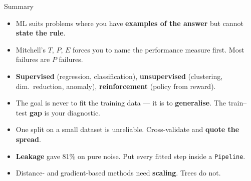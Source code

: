 \documentclass[aspectratio=169]{beamer}
\begin{document}
\begin{frame}[shrink=8]{Summary}
  \begin{itemize}[<+->]
    \item ML suits problems where you have \textbf{examples of the answer} but cannot \textbf{state the rule}.
    \item Mitchell's $T$, $P$, $E$ forces you to name the performance measure first. Most failures are $P$ failures.
    \item \textbf{Supervised} (regression, classification), \textbf{unsupervised} (clustering, dim.\ reduction, anomaly), \textbf{reinforcement} (policy from reward).
    \item The goal is never to fit the training data --- it is to \textbf{generalise}. The train--test \textbf{gap} is your diagnostic.
    \item One split on a small dataset is unreliable. Cross-validate and \textbf{quote the spread}.
    \item \textbf{Leakage} gave 81\% on pure noise. Put every fitted step inside a \texttt{Pipeline}.
    \item Distance- and gradient-based methods need \textbf{scaling}. Trees do not.
  \end{itemize}
  \slidesources{\AMLUnitISources}
\end{frame}
\end{document}
